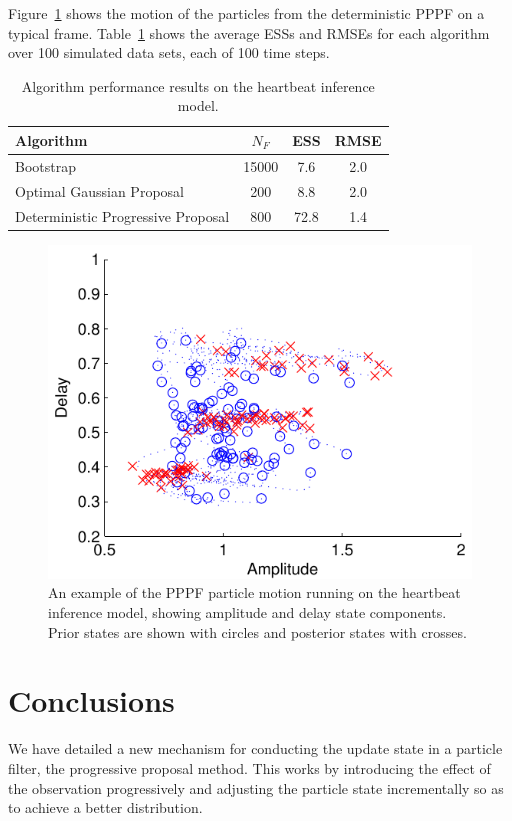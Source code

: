 \documentclass{article}
\begin{document}
Figure~\ref{fig:sineha_example_frame} shows the motion of the particles from the deterministic PPPF on a typical frame. Table~\ref{tab:sineha_results} shows the average ESSs and RMSEs for each algorithm over 100 simulated data sets, each of 100 time steps.
%
\begin{table}
\centering
\begin{tabular}{l||c|c|c}
Algorithm                                & $N_F$ & ESS  & RMSE \\
\hline
Bootstrap                                & 15000 &  7.6 &  2.0 \\
Optimal Gaussian Proposal                &   200 &  8.8 &  2.0 \\
Deterministic Progressive Proposal         &   800 & 72.8 &  1.4 \\
\end{tabular}
\caption{Algorithm performance results on the heartbeat inference model.}
\label{tab:sineha_results}
\end{table}
%
\begin{figure}
\centering
\includegraphics[width=0.7\columnwidth]{sineha_example_frame.pdf}
\caption{An example of the PPPF particle motion running on the heartbeat inference model, showing amplitude and delay state components. Prior states are shown with circles and posterior states with crosses.}
\label{fig:sineha_example_frame}
\end{figure}



\section{Conclusions}

We have detailed a new mechanism for conducting the update state in a particle filter, the progressive proposal method. This works by introducing the effect of the observation progressively and adjusting the particle state incrementally so as to achieve a better distribution.
\end{document}
